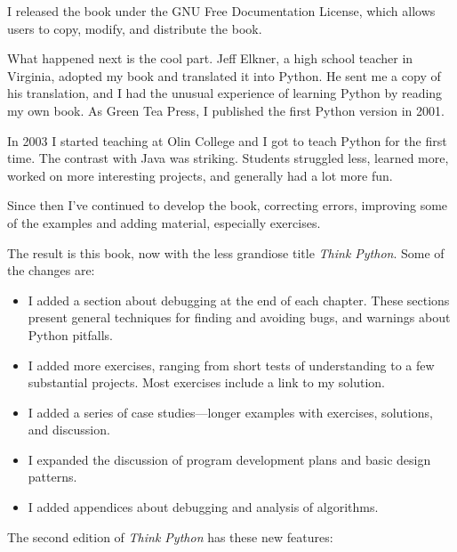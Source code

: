 \documentclass[10pt]{book}
\begin{document}
I released the book under the GNU Free Documentation License,
which allows users to copy, modify, and distribute the book.

What happened next is the cool part.  Jeff Elkner, a high school
teacher in Virginia, adopted my book and translated it into
Python.  He sent me a copy of his translation, and I had the
unusual experience of learning Python by reading my own book.
As Green Tea Press, I published the first Python version in 2001.

In 2003 I started teaching at Olin College and I got to teach
Python for the first time.  The contrast with Java was striking.
Students struggled less, learned more, worked on more interesting
projects, and generally had a lot more fun.

Since then I've continued to develop the book,
correcting errors, improving some of the examples and
adding material, especially exercises.

The result is this book, now with the less grandiose title
{\em Think Python}.  Some of the changes are:

\begin{itemize}

\item I added a section about debugging at the end of each chapter.
  These sections present general techniques for finding and avoiding
  bugs, and warnings about Python pitfalls.

\item I added more exercises, ranging from short tests of
  understanding to a few substantial projects.  Most exercises
  include a link to my solution.

\item I added a series of case studies---longer examples with
  exercises, solutions, and discussion.

\item I expanded the discussion of program development plans
  and basic design patterns.

\item I added appendices about debugging and analysis of algorithms.

\end{itemize}

The second edition of {\em Think Python} has these new features:
\end{document}
